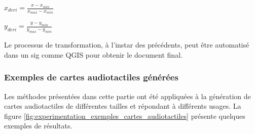 \newpar{}

$x_{deri} = \frac{x - x_{min}}{x_{max} - x_{min}}$

$y_{deri} = \frac{y - y_{min}}{y_{max} - y_{min}}$

\newpar{}

Le processus de transformation, à l'instar des précédents, peut être automatisé dans un \gls{sig} comme QGIS pour obtenir le document final.

\subsubsection{Exemples de cartes audiotactiles générées}

\label{sec:experimentation_exemples_cartes_audiotactiles}

Les méthodes présentées dans cette partie ont été appliquées à la génération de cartes audiotactiles de différentes tailles et répondant à différents usages. La figure \ref{fig:experimentation_exemples_cartes_audiotactiles} présente quelques exemples de résultats.

